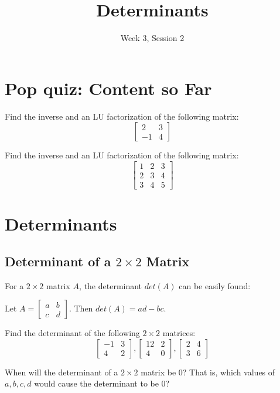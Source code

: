 \documentclass[11pt]{exam}
\title{Determinants}
\date{Week 3, Session 2}
\begin{document}
\maketitle

\section{Pop quiz: Content so Far}
    
    \vspace{20px}
    \begin{questions}
        \item Find the inverse and an LU factorization of the following matrix:
        $$\begin{bmatrix} 2 & 3 \\ -1 & 4 \end{bmatrix}$$
        \item Find the inverse and an LU factorization of the following matrix:
        $$\begin{bmatrix} 1 & 2 & 3 \\ 2 & 3 & 4 \\ 3 & 4 & 5 \end{bmatrix}$$
    \end{questions}

\pagebreak
\section{Determinants}
    
    \vspace{20px}
    \subsection{Determinant of a $2 \times 2$ Matrix}
    For a $2 \times 2$ matrix $A$, the determinant $det(A)$ can be easily found:

    Let $A = \begin{bmatrix}a & b \\ c & d\end{bmatrix}$. Then $det(A) = ad - bc$.

    \begin{questions}
        \item Find the determinant of the following $2 \times 2$ matrices:
        $$\begin{bmatrix} -1 & 3 \\ 4 & 2 \end{bmatrix}, \begin{bmatrix} 12 & 2 \\ 4 & 0 \end{bmatrix}, \begin{bmatrix} 2 & 4 \\ 3 & 6\end{bmatrix}$$
        \item When will the determinant of a $2 \times 2$ matrix be 0? That is, which values of $a,b,c,d$ would cause the determinant to be 0?
    \end{questions}
\end{document}
